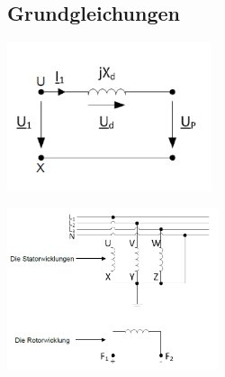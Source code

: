 \subsection{Grundgleichungen}
    \begin{minipage}[b]{0.5\linewidth}
        \includegraphics[width = 6cm]{images/Wicklung1}
    \end{minipage}
    \begin{minipage}[b]{0.5\linewidth}
        \includegraphics[width = 6.2cm]{images/Wicklungen}
    \end{minipage}
    \vspace{-1cm}
